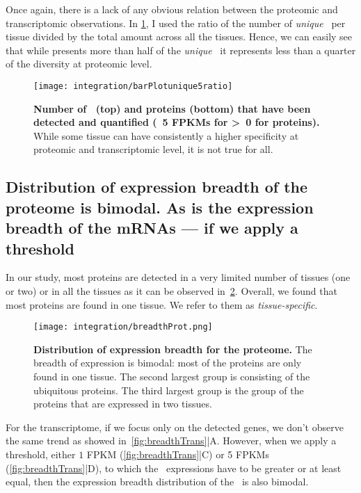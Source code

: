 Once again, there is a lack of any obvious relation between
the proteomic and transcriptomic observations.
In \cref{fig:barPlotunique5ratio}, I used the ratio of the number of \emph{unique}
\mRNAs\ per tissue divided by the total amount across all the tissues.
Hence, we can easily see that while  presents more than half of
the \emph{unique} \mRNAs\, it represents less than a quarter of the diversity
at proteomic level.

\begin{figure}[!htbp]
    \texttt{[image: integration/barPlotunique5ratio]}\centering
     \caption[Distribution of \mRNAs\ and proteins detected (at specific
     thresholds) only in one unique
     tissue]{\label{fig:barPlotunique5ratio}\textbf{Number of
     \mRNAs\ (top) and proteins (bottom)
     that have been detected and quantified (\geq\ 5 \glspl{FPKM} for \mRNA\;
     \textgreater\ 0 for proteins).} While some tissue can have
     consistently a higher
     specificity at proteomic and transcriptomic level, it is not true for all.}
\end{figure}


\subsection{Distribution of expression breadth of the proteome is bimodal. As is
the expression breadth of the mRNAs --- if we apply a threshold}
\label{subsec:IntegrationProteinBimodalExpre}

In our study, most proteins are detected in a very limited number of tissues (one
or two) or in all the tissues as it can be observed in~\cref{fig:breadthProt}.
Overall, we found that most proteins are found in one tissue. We refer to them as
\emph{tissue-specific}.

\begin{figure}[!htbp]
    \texttt{[image: integration/breadthProt.png]}\centering
    \caption[Distribution of expression breadth for the proteome]
    {\label{fig:breadthProt}\textbf{Distribution of expression breadth for the
    proteome.} The breadth of expression is bimodal: most of the proteins are
    only found in one tissue. The second largest group is consisting of
    the ubiquitous proteins. The third largest group is the group of the proteins
    that are expressed in two tissues.}
\end{figure}


For the transcriptome, if we focus only on the detected genes, we don’t observe
the same trend as showed in~\cref{fig:breadthTrans}|A.
However, when we apply a threshold, either $1$ \gls{FPKM}
(\cref{fig:breadthTrans}|C) or
5 \glspl{FPKM} (\cref{fig:breadthTrans}|D), to which the \mRNA\ expressions
have to be greater or at least equal, then the expression breadth distribution
of the \mRNAs\ is also bimodal.

